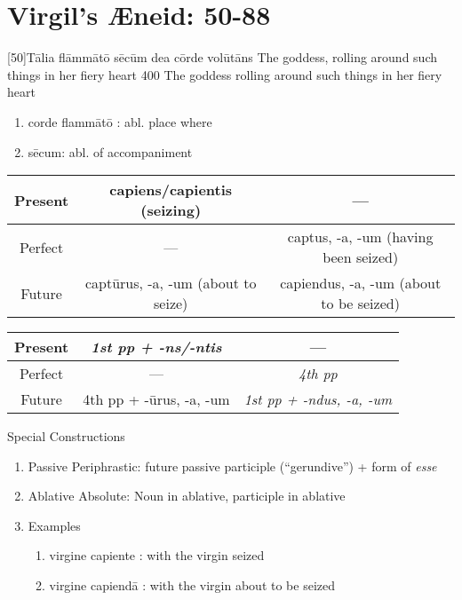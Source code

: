 
\section{Virgil's {\AE}neid:  50-88} %

\latline
  {[50]T\={\macron a}l\-i\-a fl\=amm\={\macron a}t\={\macron o} s\={\macron e}c\=um d\-e\-a c\=ord\-e v\-ol\={\macron u}t\={\macron a}ns
}
  { The goddess, rolling around such things in her fiery heart }
  {400}
  { The goddess rolling around such things in her fiery heart }
  { \begin{enumerate}
  	\item corde flamm\={a}t\={o} :  abl. place where
  	\item s\={e}cum:  abl. of accompaniment
  \end{enumerate} 

	\begin{tabular}{|c|c|c|}
	\hline
	Present & capiens/capientis (seizing)    & ---                 \\
	\hline                                                
	Perfect & ---                   & captus, -a, -um (having been seized)    \\
	\hline                                                
	Future  & capt\={u}rus, -a, -um (about to seize) & capiendus, -a, -um  (about to be seized)\\
	\hline
	\end{tabular}

  \vskip 2mm
	\begin{tabular}{|c|c|c|}	
	 \hline
	 Present &  \emph{1st pp + -ns/-ntis}  & ---\\
	 \hline    
	 Perfect &  ---                        & \emph{4th pp}\\
	 \hline    
	 Future  & 4th pp + -\={u}rus, -a, -um & \emph{1st pp + -ndus, -a, -um}\\
	 \hline
	\end{tabular}
		\vskip 2mm	
	Special Constructions
	\begin{enumerate}
		\item Passive Periphrastic:  future passive participle (``gerundive'') + form of \emph{esse}
		\item Ablative Absolute:  Noun in ablative, participle in ablative
		\item Examples
			\begin{enumerate}
				\item virgine capiente : with the virgin seized
				\item virgine capiend\={a} : with the virgin about to be seized
			\end{enumerate}
	\end{enumerate}
	
}
